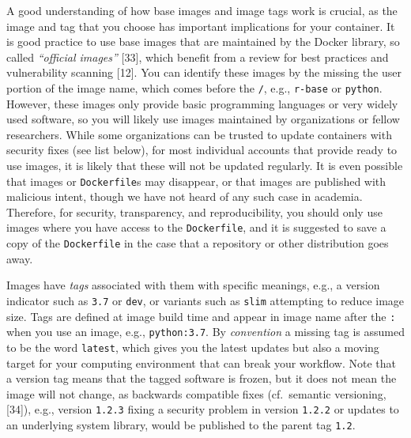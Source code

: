\documentclass[10pt,letterpaper]{article}
\begin{document}
A good understanding of how base images and image tags work is crucial,
as the image and tag that you choose has important implications for your
container. It is good practice to use base images that are maintained by
the Docker library, so called \emph{``official images''} {[}33{]}, which
benefit from a review for best practices and vulnerability scanning
{[}12{]}. You can identify these images by the missing the user portion
of the image name, which comes before the \texttt{/}, e.g.,
\texttt{r-base} or \texttt{python}. However, these images only provide
basic programming languages or very widely used software, so you will
likely use images maintained by organizations or fellow researchers.
While some organizations can be trusted to update containers with
security fixes (see list below), for most individual accounts that
provide ready to use images, it is likely that these will not be updated
regularly. It is even possible that images or \texttt{Dockerfile}s may
disappear, or that images are published with malicious intent, though we
have not heard of any such case in academia. Therefore, for security,
transparency, and reproducibility, you should only use images where you
have access to the \texttt{Dockerfile}, and it is suggested to save a
copy of the \texttt{Dockerfile} in the case that a repository or other
distribution goes away.

Images have \emph{tags} associated with them with specific meanings,
e.g., a version indicator such as \texttt{3.7} or \texttt{dev}, or
variants such as \texttt{slim} attempting to reduce image size. Tags are
defined at image build time and appear in image name after the
\texttt{:} when you use an image, e.g., \texttt{python:3.7}. By
\emph{convention} a missing tag is assumed to be the word
\texttt{latest}, which gives you the latest updates but also a moving
target for your computing environment that can break your workflow. Note
that a version tag means that the tagged software is frozen, but it does
not mean the image will not change, as backwards compatible fixes
(cf.~semantic versioning, {[}34{]}), e.g., version \texttt{1.2.3} fixing
a security problem in version \texttt{1.2.2} or updates to an underlying
system library, would be published to the parent tag \texttt{1.2}.
\end{document}
